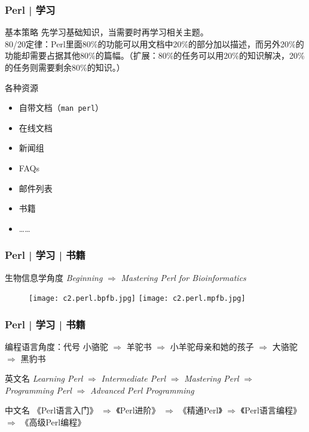 \begin{frame}[fragile]
  \frametitle{Perl | 学习}
  \begin{block}{基本策略}
    先学习基础知识，当需要时再学习相关主题。\\
    80/20定律：Perl里面80\%的功能可以用文档中20\%的部分加以描述，而另外20\%的功能却需要占据其他80\%的篇幅。（扩展：80\%的任务可以用20\%的知识解决，20\%的任务则需要剩余80\%的知识。）
  \end{block}
  \pause
  \begin{block}{各种资源}
    \begin{itemize}
      \item 自带文档（\verb|man perl|）
      \item 在线文档
      \item 新闻组
      \item FAQs
      \item 邮件列表
      \item 书籍
      \item ……
    \end{itemize}
  \end{block}
\end{frame}

\begin{frame}
  \frametitle{Perl | 学习 | 书籍}
  \begin{block}{生物信息学角度}
    \textit{Beginning} $\Longrightarrow$ \textit{Mastering Perl for Bioinformatics}
  \end{block}
  \begin{figure}
    \centering
    \texttt{[image: c2.perl.bpfb.jpg]}
    \hspace{1em}
    \texttt{[image: c2.perl.mpfb.jpg]}
  \end{figure}
\end{frame}

\begin{frame}
  \frametitle{Perl | 学习 | 书籍}
  \begin{block}{编程语言角度：代号}
小骆驼 $\Rightarrow$ 羊驼书 $\Rightarrow$ 小羊驼母亲和她的孩子 $\Rightarrow$ 大骆驼 $\Rightarrow$ 黑豹书
  \end{block}
  \pause
  \begin{block}{英文名}
    \textit{Learning Perl} $\Rightarrow$ \textit{Intermediate Perl} $\Rightarrow$ \textit{Mastering Perl} $\Rightarrow$ \textit{Programming Perl} $\Rightarrow$ \textit{Advanced Perl Programming}
  \end{block}
  \pause
  \begin{block}{中文名}
    《Perl语言入门》 $\Rightarrow$ 《Perl进阶》 $\Rightarrow$ 《精通Perl》 $\Rightarrow$ 《Perl语言编程》 $\Rightarrow$ 《高级Perl编程》
  \end{block}
  \pause
\end{frame}


